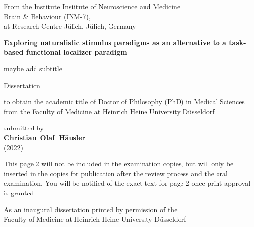 \documentclass[english,12pt]{report}
\begin{document}
\pagestyle{plain}
\begin{spacing}{1.5}




\begin{titlepage}
\begin{center}

From the Institute Institute of Neuroscience and Medicine,\\
Brain \& Behaviour (INM-7),\\
at Research Centre Jülich, Jülich, Germany

\vfill

\textbf{{\large Exploring naturalistic stimulus paradigms as an alternative to a
    task-based functional localizer paradigm}}

maybe add subtitle

\vfill

{\large Dissertation}

\vfill

to obtain the academic title of Doctor of Philosophy (PhD) in Medical Sciences\\
from the Faculty of Medicine at Heinrich Heine University Düsseldorf

\vfill

submitted by\\
\textbf{Christian~Olaf~Häusler}\\
(2022)

\end{center}
\end{titlepage}




\newpage

\noindent This page 2 will not be included in the examination copies, but will
only be inserted in the copies for publication after the review process and
the oral examination. You will be notified of the exact text for page 2 once
print approval is granted.

\vfill
\noindent As an inaugural dissertation printed by permission of the\\
Faculty of Medicine at Heinrich Heine University Düsseldorf


\end{spacing}
\end{document}
